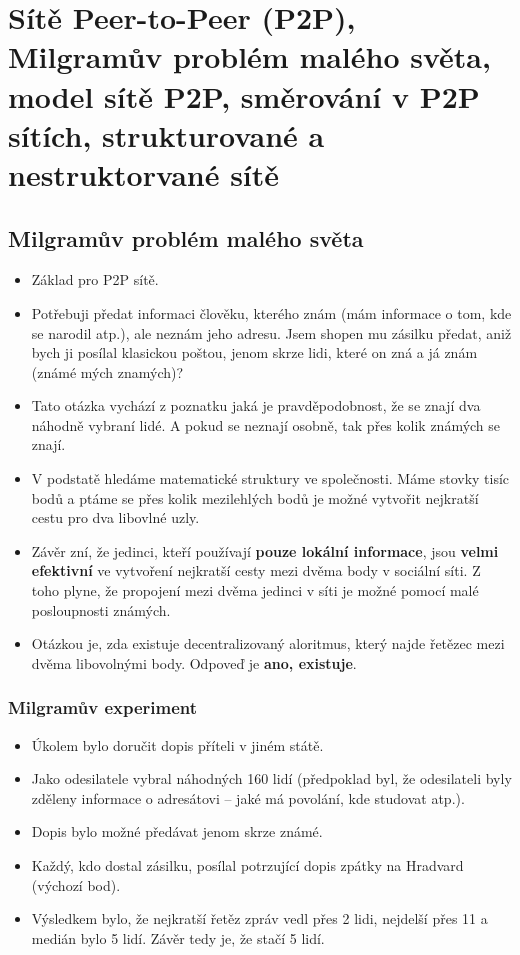 \documentclass[11pt,a4paper]{article}
\begin{document}
 \sloppy
\titlepageandcontents

\section{Sítě Peer-to-Peer (P2P), Milgramův problém malého světa, model sítě P2P, směrování v P2P
sítích, strukturované a nestruktorvané sítě}
\subsection{Milgramův problém malého světa}\label{small_world}
\begin{itemize}
\item Základ pro P2P sítě.
\item Potřebuji předat informaci člověku, kterého znám (mám informace o tom, kde se narodil atp.), ale neznám jeho adresu. Jsem shopen mu zásilku předat, aniž bych ji posílal klasickou poštou, jenom skrze lidi, které on zná a já znám (známé mých znamých)? 
\item Tato otázka vychází z poznatku jaká je pravděpodobnost, že se znají dva náhodně vybraní lidé. A pokud se neznají osobně, tak přes kolik známých se znají.
\item V podstatě hledáme matematické struktury ve společnosti. Máme stovky tisíc bodů a ptáme se přes kolik mezilehlých bodů je možné vytvořit nejkratší cestu pro dva libovlné uzly.
\item Závěr zní, že jedinci, kteří používají \textbf{pouze lokální informace}, jsou \textbf{velmi efektivní} ve vytvoření nejkratší cesty mezi dvěma body v sociální síti. Z toho plyne, že propojení mezi dvěma jedinci v síti je možné pomocí malé posloupnosti známých.
\item Otázkou je, zda existuje decentralizovaný aloritmus, který najde řetězec mezi dvěma libovolnými body. Odpoveď je \textbf{ano, existuje}.
\end{itemize}
\subsubsection{Milgramův experiment}
\begin{itemize}
\item Úkolem bylo doručit dopis příteli v jiném státě.
\item Jako odesilatele vybral náhodných 160 lidí (předpoklad byl, že odesilateli byly zděleny informace o adresátovi -- jaké má povolání, kde studovat atp.).
\item Dopis bylo možné předávat jenom skrze známé.
\item Každý, kdo dostal zásilku, posílal potrzující dopis zpátky na Hradvard (výchozí bod).
\item Výsledkem bylo, že nejkratší řetěz zpráv vedl přes 2 lidi, nejdelší přes 11 a medián bylo 5 lidí. Závěr tedy je, že stačí 5 lidí.
\end{itemize}
\end{document}
